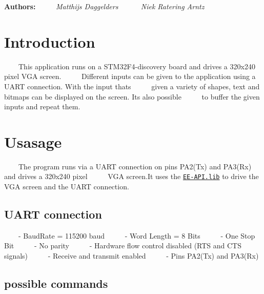 {\bfseries Authors\+:}~\newline
 ~~~~{\itshape  Matthijs Daggelders }~\newline
 ~~~~{\itshape  Niek Ratering Arntz }~\newline
\hypertarget{index_intro_sec}{}\section{Introduction}\label{index_intro_sec}
~~~~This application runs on a S\+T\+M32\+F4-\/discovery board and drives a 320x240 pixel V\+GA screen.~\newline
 ~~~~Different inputs can be given to the application using a U\+A\+RT connection. With the input thats~\newline
 ~~~~given a variety of shapes, text and bitmaps can be displayed on the screen. It\textquotesingle{}s also possible~\newline
 ~~~~to buffer the given inputs and repeat them.\hypertarget{index_usage_sec}{}\section{Usasage}\label{index_usage_sec}
~~~~The program runs via a U\+A\+RT connection on pins P\+A2(\+Tx) and P\+A3(\+Rx) and drives a 320x240 pixel~\newline
 ~~~~V\+GA screen.\+It uses the \href{}{\tt E\+E-\/\+A\+P\+I.\+lib} to drive the V\+GA screen and the U\+A\+RT connection.~\newline
\hypertarget{index_uart_sec}{}\subsection{U\+A\+R\+T connection}\label{index_uart_sec}
~~~~-\/ Baud\+Rate = 115200 baud~\newline
 ~~~~-\/ Word Length = 8 Bits~\newline
 ~~~~-\/ One Stop Bit~\newline
 ~~~~-\/ No parity~\newline
 ~~~~-\/ Hardware flow control disabled (R\+TS and C\+TS signals)~\newline
 ~~~~-\/ Receive and transmit enabled~\newline
 ~~~~-\/ Pins P\+A2(\+Tx) and P\+A3(\+Rx)~\newline
\hypertarget{index_input_sec}{}\subsection{possible commands}\label{index_input_sec}

